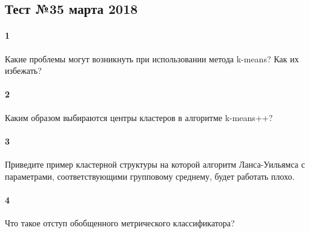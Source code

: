 \documentclass[a4paper,12pt]{article}
\begin{document}
  \subsection*{Тест №3\hfill{5 марта 2018}}

  \paragraph{1} Какие проблемы могут возникнуть при использовании метода k-means? Как их избежать?

  \makebox[\linewidth]{\hrulefill}
  \makebox[\linewidth]{\hrulefill}
  \makebox[\linewidth]{\hrulefill}
  \makebox[\linewidth]{\hrulefill}

	\paragraph{2} Каким образом выбираются центры кластеров в алгоритме k-means++?
	
  \makebox[\linewidth]{\hrulefill}
  \makebox[\linewidth]{\hrulefill}
  \makebox[\linewidth]{\hrulefill}
	
  \paragraph{3}  Приведите пример кластерной структуры на которой алгоритм
  Ланса-Уильямса с параметрами, соответствующими групповому среднему, будет
  работать плохо.

  \hspace{6em}
  
  \paragraph{4} Что такое отступ обобщенного метрического классификатора?

  \makebox[\linewidth]{\hrulefill}
  \makebox[\linewidth]{\hrulefill}
\end{document}
